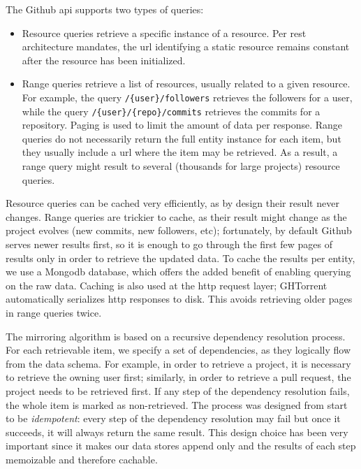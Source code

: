 \documentclass[conference]{IEEEtran}
\begin{document}
The Github {\sc api} supports two types of queries:

\begin{itemize}

  \item Resource queries retrieve a specific instance of a resource. Per 
    {\sc rest} architecture mandates, the {\sc url} identifying a static
    resource remains constant after the resource has been initialized. 

  \item Range queries retrieve a list of resources, usually related to a given
    resource. For example, the query \texttt{/\{user\}/followers} retrieves the
    followers for a user, while the query \texttt{/\{user\}/\{repo\}/commits}
    retrieves the commits for a repository. Paging is used to limit the amount
    of data per response. Range queries do not necessarily return the full
    entity instance for each item, but they usually include a {\sc url} where
    the item may be retrieved. As a result, a range query might result to
    several (thousands for large projects) resource queries.

\end{itemize}

Resource queries can be cached very efficiently, as by design their result never
changes. Range queries are trickier to cache, as their result might change as
the project evolves (new commits, new followers, etc); fortunately, by default
Github serves newer results first, so it is enough to go through the first few
pages of results only in order to retrieve the updated data. To cache the
results per entity, we use a Mongo{\sc db} database, which offers the added
benefit of enabling querying on the raw data. Caching is also used at the {\sc
http} request layer; GHTorrent automatically serializes {\sc http} responses to
disk. This avoids retrieving older pages in range queries twice.

%
The mirroring algorithm is based on a recursive dependency resolution process.
For each retrievable item, we specify a set of dependencies, as they logically
flow from the data schema. For example, in order to retrieve a \textsf{project},
it is necessary to retrieve the owning \textsf{user} first; similarly, in order
to retrieve a pull request, the \textsf{project} needs to be retrieved first. If
any step of the dependency resolution fails, the whole item is marked as
non-retrieved.  The process was designed from start to be \emph{idempotent}:
every step of the dependency resolution may fail but once it succeeds, it will
always return the same result. This design choice has been very important since
it makes our data stores append only and the results of each step memoizable and
therefore cachable.
\end{document}
